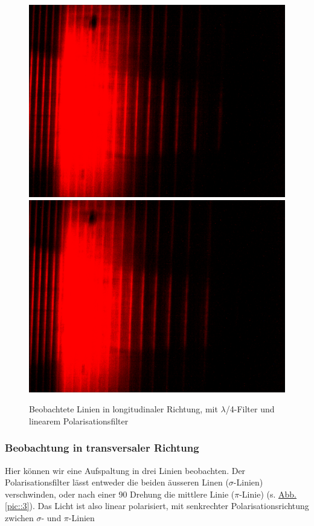       \begin{figure}[H]
        \centering
        \includegraphics[width=.6\paperwidth, trim={0 650pt 0 200pt}, clip]{Auswertung/data/long/10A_2}
        \includegraphics[width=.6\paperwidth, trim={0 0 0 886pt}, clip]{Auswertung/data/long/10A_1}
        \caption{Beobachtete Linien in longitudinaler Richtung, mit $\lambda$/4-Filter und linearem Polarisationsfilter}
        \label{pic::2}
      \end{figure}
    \newpage
    \subsubsection{Beobachtung in transversaler Richtung}
      Hier können wir eine Aufspaltung in drei Linien beobachten. Der Polarisationsfilter lässt entweder die beiden äusseren Linen ($\sigma$-Linien) verschwinden, oder nach einer \SI{90}{\deg} Drehung die mittlere Linie ($\pi$-Linie) (s. \hyperref[pic::3]{Abb. \ref*{pic::3}}). Das Licht ist also linear polarisiert, mit senkrechter Polarisationsrichtung zwichen $\sigma$- und $\pi$-Linien

